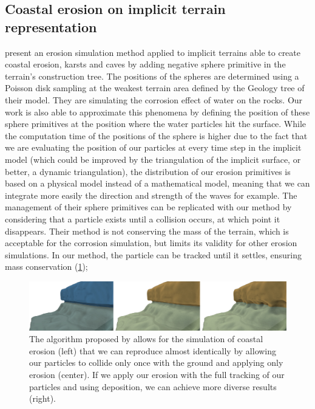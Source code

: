 \subsection{Coastal erosion on implicit terrain representation}
\citep{Paris2019} present an erosion simulation method applied to implicit terrains able to create coastal erosion, karsts and caves by adding negative sphere primitive in the terrain's construction tree. The positions of the spheres are determined using a Poisson disk sampling at the weakest terrain area defined by the Geology tree of their model. They are simulating the corrosion effect of water on the rocks. Our work is also able to approximate this phenomena by defining the position of these sphere primitives at the position where the water particles hit the surface. While the computation time of the positions of the sphere is higher due to the fact that we are evaluating the position of our particles at every time step in the implicit model (which could be improved by the triangulation of the implicit surface, or better, a dynamic triangulation), the distribution of our erosion primitives is based on a physical model instead of a mathematical model, meaning that we can integrate more easily the direction and strength of the waves for example. The management of their sphere primitives can be replicated with our method by considering that a particle exists until a collision occurs, at which point it disappears. Their method is not conserving the mass of the terrain, which is acceptable for the corrosion simulation, but limits its validity for other erosion simulations. In our method, the particle can be tracked until it settles, ensuring mass conservation (\cref{fig:erosion_screen-paris2019-1});

\begin{figure}
\centering
\includegraphics{otherPapersRepro/costal.pdf}
\caption{The algorithm proposed by \cite{Paris2019} allows for the simulation of coastal erosion (left) that we can reproduce almost identically by allowing our particles to collide only once with the ground and applying only erosion (center). If we apply our erosion with the full tracking of our particles and using deposition, we can achieve more diverse results (right).}
\label{fig:erosion_screen-paris2019-1}
\end{figure}

